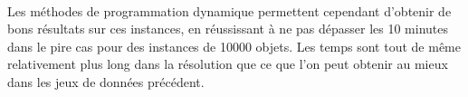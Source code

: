\documentclass[12pt]{article}
\begin{document}
\paragraph{}Les méthodes de programmation dynamique permettent cependant d'obtenir de bons résultats sur ces instances, en réussissant à ne pas dépasser les 10 minutes dans le pire cas pour des instances de 10000 objets. Les temps sont tout de même relativement plus long dans la résolution que ce que l'on peut obtenir au mieux dans les jeux de données précédent.
\end{document}
